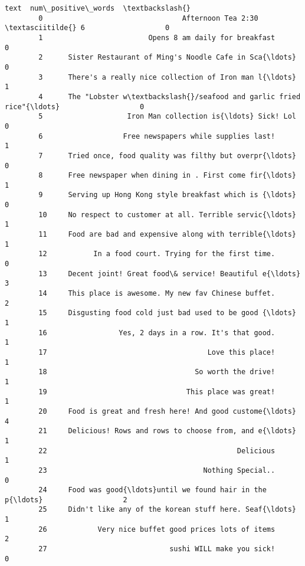 \documentclass[11pt]{article}
\begin{document}
\begin{Verbatim}[commandchars=\\\{\}]
                                                            text  num\_positive\_words  \textbackslash{}
        0                                 Afternoon Tea 2:30 \textasciitilde{} 6                   0   
        1                         Opens 8 am daily for breakfast                   0   
        2      Sister Restaurant of Ming's Noodle Cafe in Sca{\ldots}                   0   
        3      There's a really nice collection of Iron man l{\ldots}                   1   
        4      The "Lobster w\textbackslash{}/seafood and garlic fried rice"{\ldots}                   0   
        5                    Iron Man collection is{\ldots} Sick! Lol                   0   
        6                   Free newspapers while supplies last!                   1   
        7      Tried once, food quality was filthy but overpr{\ldots}                   0   
        8      Free newspaper when dining in . First come fir{\ldots}                   1   
        9      Serving up Hong Kong style breakfast which is {\ldots}                   0   
        10     No respect to customer at all. Terrible servic{\ldots}                   1   
        11     Food are bad and expensive along with terrible{\ldots}                   1   
        12           In a food court. Trying for the first time.                   0   
        13     Decent joint! Great food\& service! Beautiful e{\ldots}                   3   
        14     This place is awesome. My new fav Chinese buffet.                   2   
        15     Disgusting food cold just bad used to be good {\ldots}                   1   
        16                 Yes, 2 days in a row. It's that good.                   1   
        17                                      Love this place!                   1   
        18                                   So worth the drive!                   1   
        19                                 This place was great!                   1   
        20     Food is great and fresh here! And good custome{\ldots}                   4   
        21     Delicious! Rows and rows to choose from, and e{\ldots}                   1   
        22                                             Delicious                   1   
        23                                     Nothing Special..                   0   
        24     Food was good{\ldots}until we found hair in the p{\ldots}                   2   
        25     Didn't like any of the korean stuff here. Seaf{\ldots}                   1   
        26            Very nice buffet good prices lots of items                   2   
        27                             sushi WILL make you sick!                   0   

\end{Verbatim}
\end{document}
